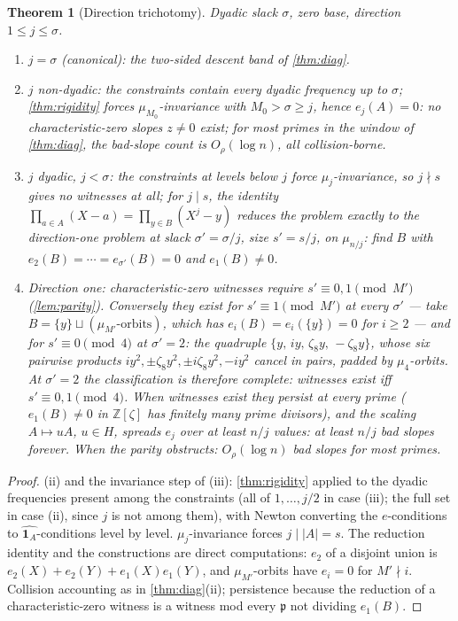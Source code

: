 \documentclass[11pt]{article}
\newtheorem{theorem}{Theorem}[section]
\theoremstyle{definition}
\newcommand{\Z}{\mathbb Z}
\begin{document}
\begin{theorem}[Direction trichotomy]\label{thm:directions}
Dyadic slack $\sigma$, zero base, direction $1\le j\le\sigma$.
\begin{enumerate}[label=(\roman*),leftmargin=2.2em]
\item $j=\sigma$ (canonical): the two-sided descent band of \cref{thm:diag}.
\item $j$ non-dyadic: the constraints contain every dyadic frequency up to $\sigma$; \cref{thm:rigidity} forces $\mu_{M_0}$-invariance with $M_0>\sigma\ge j$, hence $e_j(A)=0$: \emph{no characteristic-zero slopes $z\ne0$ exist}; for most primes in the window of \cref{thm:diag}, the bad-slope count is $O_\rho(\log n)$, all collision-borne.
\item $j$ dyadic, $j<\sigma$: the constraints at levels below $j$ force $\mu_j$-invariance, so $j\nmid s$ gives no witnesses at all; for $j\mid s$, the identity $\prod_{a\in A}(X-a)=\prod_{y\in B}(X^j-y)$ reduces the problem \emph{exactly} to the direction-one problem at slack $\sigma'=\sigma/j$, size $s'=s/j$, on $\mu_{n/j}$: find $B$ with $e_2(B)=\cdots=e_{\sigma'}(B)=0$ and $e_1(B)\ne0$.
\item Direction one: characteristic-zero witnesses require $s'\equiv0,1\pmod{M'}$ (\cref{lem:parity}).  Conversely they exist for $s'\equiv1\pmod{M'}$ at every $\sigma'$ --- take $B=\{y\}\sqcup(\mu_{M'}\text{-orbits})$, which has $e_i(B)=e_i(\{y\})=0$ for $i\ge2$ --- and for $s'\equiv0\pmod4$ at $\sigma'=2$: the quadruple $\{y,\,iy,\,\zeta_8y,\,-\zeta_8y\}$, whose six pairwise products $iy^2,\pm\zeta_8y^2,\pm i\zeta_8y^2,-iy^2$ cancel in pairs, padded by $\mu_4$-orbits.  At $\sigma'=2$ the classification is therefore complete: witnesses exist iff $s'\equiv0,1\pmod4$.  When witnesses exist they persist at \emph{every} prime ($e_1(B)\ne0$ in $\Z[\zeta]$ has finitely many prime divisors), and the scaling $A\mapsto uA$, $u\in H$, spreads $e_j$ over at least $n/j$ values: at least $n/j$ bad slopes forever.  When the parity obstructs: $O_\rho(\log n)$ bad slopes for most primes.
\end{enumerate}
\end{theorem}

\begin{proof}
(ii) and the invariance step of (iii): \cref{thm:rigidity} applied to the dyadic frequencies present among the constraints (all of $1,\dots,j/2$ in case (iii); the full set in case (ii), since $j$ is not among them), with Newton converting the $e$-conditions to $\widehat{\mathbf1_A}$-conditions level by level.  $\mu_j$-invariance forces $j\mid|A|=s$.  The reduction identity and the constructions are direct computations: $e_2$ of a disjoint union is $e_2(X)+e_2(Y)+e_1(X)e_1(Y)$, and $\mu_{M'}$-orbits have $e_i=0$ for $M'\nmid i$.  Collision accounting as in \cref{thm:diag}(ii); persistence because the reduction of a characteristic-zero witness is a witness mod every $\mathfrak p$ not dividing $e_1(B)$.
\end{proof}
\end{document}
